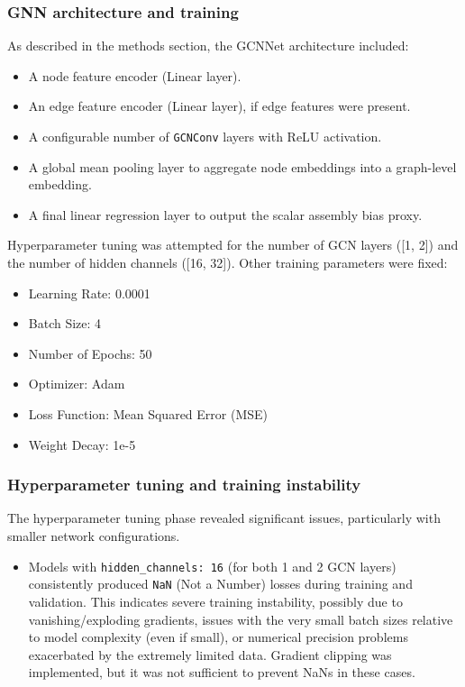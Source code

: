 \documentclass[twocolumn]{aastex631}
\begin{document}
\subsubsection{GNN architecture and training}
As described in the methods section, the GCNNet architecture included:
\begin{itemize}
    \item A node feature encoder (Linear layer).
    \item An edge feature encoder (Linear layer), if edge features were present.
    \item A configurable number of \texttt{GCNConv} layers with ReLU activation.
    \item A global mean pooling layer to aggregate node embeddings into a graph-level embedding.
    \item A final linear regression layer to output the scalar assembly bias proxy.
\end{itemize}

Hyperparameter tuning was attempted for the number of GCN layers ([1, 2]) and the number of hidden channels ([16, 32]). Other training parameters were fixed:
\begin{itemize}
    \item Learning Rate: 0.0001
    \item Batch Size: 4
    \item Number of Epochs: 50
    \item Optimizer: Adam
    \item Loss Function: Mean Squared Error (MSE)
    \item Weight Decay: 1e-5
\end{itemize}

\subsubsection{Hyperparameter tuning and training instability}
The hyperparameter tuning phase revealed significant issues, particularly with smaller network configurations.
\begin{itemize}
    \item Models with \texttt{hidden\_channels: 16} (for both 1 and 2 GCN layers) consistently produced \texttt{NaN} (Not a Number) losses during training and validation. This indicates severe training instability, possibly due to vanishing/exploding gradients, issues with the very small batch sizes relative to model complexity (even if small), or numerical precision problems exacerbated by the extremely limited data. Gradient clipping was implemented, but it was not sufficient to prevent NaNs in these cases.
\end{itemize}
\end{document}

